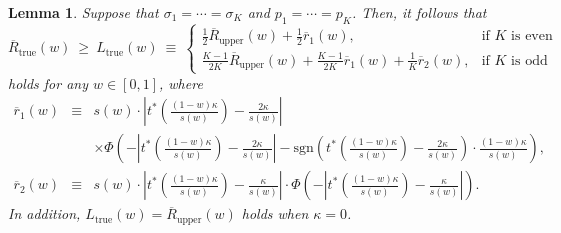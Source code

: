 \documentclass[12pt,a4paper]{article}
\newtheorem{Lemma}{Lemma}
\begin{document}
\begin{Lemma}\label{lem:prop1}
Suppose that $\sigma_1 = \cdots = \sigma_K$ and $p_1 = \cdots = p_K$. Then, it follows that
\[
\overline{R}_{\mathrm{true}}(w) \ \geq \ L_{\mathrm{true}}(w) \ \equiv \ \begin{cases}
\frac{1}{2} \overline{R}_{\mathrm{upper}}(w) + \frac{1}{2} \overline{r}_1(w), & \text{if $K$ is even} \\
\frac{K-1}{2K} \overline{R}_{\mathrm{upper}}(w) + \frac{K-1}{2K} \overline{r}_1(w) + \frac{1}{K} \overline{r}_2(w), & \text{if $K$ is odd}
\end{cases}
\]
holds for any $w \in [0,1]$, where
\begin{eqnarray*}
\overline{r}_{1}(w) & \equiv & s(w) \cdot \left| t^{\ast}\left( \frac{(1-w)\kappa}{s(w)} \right) - \frac{2\kappa}{s(w)} \right| \\
& & \times  \Phi \left( -  \left| t^{\ast}\left( \frac{(1-w)\kappa}{s(w)} \right) - \frac{2\kappa}{s(w)} \right| - \mathrm{sgn} \left( t^{\ast}\left( \frac{(1-w)\kappa}{s(w)} \right) - \frac{2\kappa}{s(w)} \right) \cdot \frac{(1-w)\kappa}{s(w)} \right), \\
\overline{r}_{2}(w) & \equiv & s(w) \cdot \left| t^{\ast}\left( \frac{(1-w)\kappa}{s(w)} \right) - \frac{\kappa}{s(w)} \right| \cdot \Phi \left( - \left| t^{\ast}\left( \frac{(1-w)\kappa}{s(w)} \right) - \frac{\kappa}{s(w)} \right| \right).
\end{eqnarray*}
In addition, $L_{\mathrm{true}}(w) = \overline{R}_{\mathrm{upper}}(w)$ holds when $\kappa=0$.
\end{Lemma}
\end{document}
